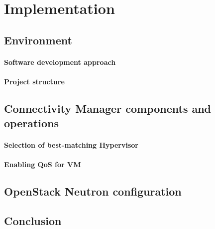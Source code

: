 \chapter{Implementation}

\section{Environment}

\subsubsection{Software development approach}

\subsubsection{Project structure}

\section{Connectivity Manager components and operations}

\subsubsection{Selection of best-matching Hypervisor}

\subsubsection{Enabling QoS for VM}

\section{OpenStack Neutron configuration}

\section{Conclusion}